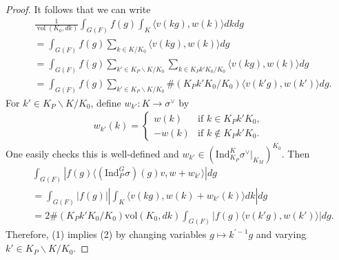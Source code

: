 \documentclass[10pt]{amsart}
\theoremstyle{definition}
\numberwithin{equation}{section}
\DeclareMathOperator{\vol}{\mathrm{vol}}
\numberwithin{equation}{subsection}
\newcommand{\Ind}{\mathrm{Ind}}
\begin{document}
\begin{proof}
It follows that we can write
\begin{align*}
    &\frac{1}{\vol(K_0,dk)}\int_{G(F)} f(g)\int_K  \langle v(kg),w(k)\rangle dkdg\\
    &=   \int_{G(F)} f(g) \sum_{k\in K/K_0}  \langle v(kg),w(k)\rangle dg\\
    &=\int_{G(F)} f(g) \sum_{k'\in K_P\backslash  K/K_0} \sum_{k\in K_Pk'K_0/K_0} \langle v(kg),w(k)\rangle dg\\
    &=\int_{G(F)} f(g) \sum_{k'\in K_P\backslash K/K_0} \#(K_Pk'K_0/K_0) \langle v(k'g),w(k')\rangle dg.
\end{align*}
For $k'\in K_P\backslash  K/K_0$, define $w_{k'}:K\to \sigma^\vee$ by
\begin{align*}
    w_{k'}(k) = \left\{\begin{array}{ll}
        w(k) &\textrm{if } k\in K_Pk'K_0,  \\
        -w(k) &\textrm{if } k\not\in K_Pk'K_0. 
    \end{array}\right.
\end{align*}
One easily checks this is well-defined and $w_{k'}\in (\Ind_{K_P }^K\sigma^\vee\vert_{K_M })^{K_0}$. Then
\begin{align*}
     &\int_{G(F)} \left|f(g)\langle(\mathrm{Ind}_P^G \sigma)(g)v,w+w_{k'} \rangle\right| dg\\
     &=\int_{G(F)} |f(g)| \left|\int_K \langle v(kg),w(k)+w_{k'}(k)\rangle dk\right|dg \\
     &= 2\#(K_Pk'K_0/K_0)\mathrm{vol}(K_0,dk)\int_{G(F)}|f(g)  \langle v(k'g),w(k')\rangle| dg.
\end{align*}
Therefore, (1) implies (2) by changing variables $g\mapsto k^{\prime-1}g$ and varying $k'\in K_P\backslash  K/K_0$. 
\end{proof}
\end{document}
